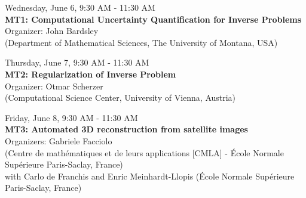 \begin{center}{\large{
      Wednesday, June 6, 9:30 AM - 11:30 AM \\
      \textbf{MT1: Computational Uncertainty Quantification for Inverse Problems}\\
      Organizer: John Bardsley \\(Department of Mathematical Sciences, The University of Montana, USA)}}
\end{center}
\vspace{0.5cm}
\begin{center}{\large{
      Thursday, June 7, 9:30 AM - 11:30 AM \\
      \textbf{MT2: Regularization of Inverse Problem}\\
      Organizer: Otmar Scherzer\\ (Computational Science Center, University of Vienna, Austria) }}
\end{center}

\vspace{0.5cm}
\begin{center}{\large{
      Friday, June 8, 9:30 AM - 11:30 AM \\
      \textbf{MT3: Automated 3D reconstruction from satellite images}\\
      Organizers: Gabriele Facciolo\\ (Centre de math\'ematiques et de leurs applications [CMLA] - \'Ecole Normale Sup\'erieure Paris-Saclay, France) \\with Carlo de Franchis and Enric Meinhardt-Llopis (\'Ecole Normale Sup\'erieure Paris-Saclay, France)  }}
\end{center}

